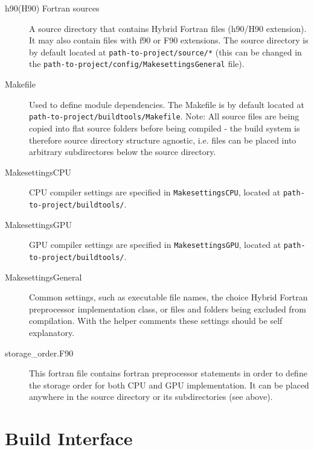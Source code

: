 \begin{description}
 \item[h90(H90) Fortran sources] A source directory that contains Hybrid Fortran files (h90/H90 extension). It may also contain files with f90 or F90 extensions. The source directory is by default located at \verb|path-to-project/source/*| (this can be changed in the \verb|path-to-project/config/MakesettingsGeneral| file).
 \item[Makefile] Used to define module dependencies. The Makefile is by default located at \verb|path-to-project/buildtools/Makefile|. Note: All source files are being copied into flat source folders before being compiled - the build system is therefore source directory structure agnostic, i.e. files can be placed into arbitrary subdirectores below the source directory.
  \item[MakesettingsCPU] CPU compiler settings are specified in \verb|MakesettingsCPU|, located at \verb|path-to-project/buildtools/|.
  \item[MakesettingsGPU] GPU compiler settings are specified in \verb|MakesettingsGPU|, located at \verb|path-to-project/buildtools/|.
  \item[MakesettingsGeneral] Common settings, such as executable file names, the choice Hybrid Fortran preprocessor implementation class, or files and folders being excluded from compilation. With the helper comments these settings should be self explanatory.
 \item[storage\_order.F90] This fortran file contains fortran preprocessor statements in order to define the storage order for both CPU and GPU implementation. It can be placed anywhere in the source directory or its subdirectories (see above).
\end{description}

\section{Build Interface} \label{sub:buildInterface}

